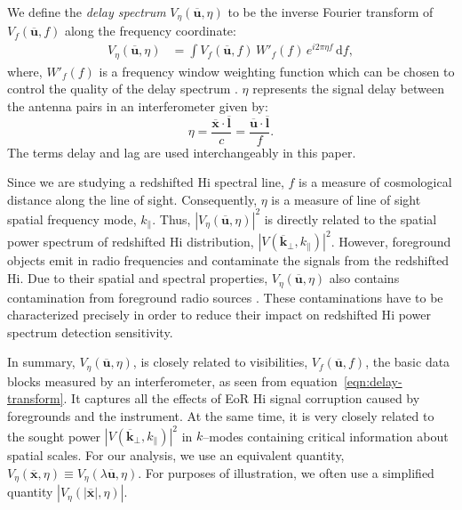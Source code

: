 \documentclass[preprint2,iop,numberedappendix]{emulateapj}
\newcommand{\dif}{\mathrm{d}}
\begin{document}
We define the {\it delay spectrum} $V_\eta(\overline{\mathbf{u}},\eta)$ to be the inverse Fourier transform of $V_f(\overline{\mathbf{u}},f)$ along the frequency coordinate:
\begin{align}\label{eqn:delay-transform}
  V_\eta(\overline{\mathbf{u}},\eta) &= \int V_f(\overline{\mathbf{u}},f)\,W'_f(f)\,e^{i2\pi\eta f}\,\dif f,
\end{align}
where, $W'_f(f)$ is a frequency window weighting function which can be chosen to control the quality of the delay spectrum \citep{thy13,ved12}. $\eta$ represents the signal delay between the antenna pairs in an interferometer given by:
\begin{equation}\label{eqn:delay}
  \eta = \frac{\overline{\mathbf{x}}\cdot\overline{\mathbf{l}}}{c} = \frac{\overline{\mathbf{u}}\cdot\overline{\mathbf{l}}}{f}.
\end{equation}
The terms delay and lag are used interchangeably in this paper.

Since we are studying a redshifted H{\sc i} spectral line, $f$ is a measure of cosmological distance along the line of sight. Consequently, $\eta$ is a measure of line of sight spatial frequency mode, $k_\parallel$. Thus, $|V_\eta(\overline{\mathbf{u}},\eta)|^2$ is directly related to the spatial power spectrum of redshifted H{\sc i} distribution, $|V(\overline{\mathbf{k}}_\perp,k_\parallel)|^2$. However, foreground objects emit in radio frequencies and contaminate the signals from the redshifted H{\sc i}. Due to their spatial and spectral properties, $V_\eta(\overline{\mathbf{u}},\eta)$ also contains contamination from foreground radio sources \citep{thy13,tro12,mor12,bow09}. These contaminations have to be characterized precisely in order to reduce their impact on redshifted H{\sc i} power spectrum detection sensitivity. 

In summary, $V_\eta(\overline{\mathbf{u}},\eta)$, is closely related to visibilities, $V_f(\overline{\mathbf{u}},f)$, the basic data blocks measured by an interferometer, as seen from equation~\ref{eqn:delay-transform}. It captures all the effects of EoR H{\sc i} signal corruption caused by foregrounds and the instrument. At the same time, it is very closely related to the sought power $|V(\overline{\mathbf{k}}_\perp,k_\parallel)|^2$ in $k$--modes containing critical information about spatial scales. For our analysis, we use an equivalent quantity, $V_\eta(\overline{\mathbf{x}},\eta) \equiv V_\eta(\lambda\overline{\mathbf{u}},\eta)$. For purposes of illustration, we often use a simplified quantity $|V_\eta(|\overline{\mathbf{x}}|,\eta)|$.
\end{document}
